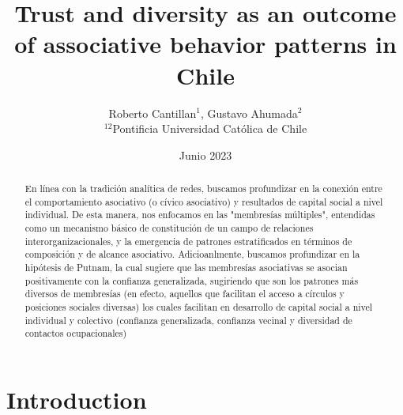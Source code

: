 





\title{Trust and diversity as an outcome of associative behavior patterns in Chile}
\author{Roberto Cantillan$^{1}$, Gustavo Ahumada$^{2}$  \\
        \small $^{12}$Pontificia Universidad Católica de Chile \\
}

\date{Junio 2023}



\maketitle


\begin{abstract}
En línea con la tradición analítica de redes, buscamos profundizar en la conexión entre el comportamiento asociativo (o cívico asociativo) y resultados de capital social a nivel individual. De esta manera, nos enfocamos en las "membresías múltiples", entendidas como un mecanismo básico de constitución de un campo de relaciones interorganizacionales, y la emergencia de patrones estratificados en términos de composición y de alcance asociativo. Adicioanlmente, buscamos profundizar en la hipótesis de Putnam, la cual sugiere que las membresías asociativas se asocian positivamente con la confianza generalizada, sugiriendo que son los patrones más diversos de membresías (en efecto, aquellos que facilitan el acceso a círculos y posiciones sociales diversas) los cuales facilitan en desarrollo de capital social a nivel individual y colectivo (confianza generalizada, confianza vecinal y diversidad de contactos ocupacionales)
\end{abstract}
\hspace{10pt}


\newpage





\maketitle

\section{Introduction}

